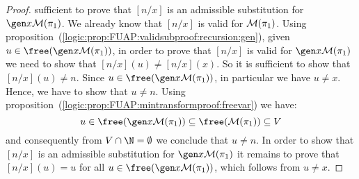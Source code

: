 \begin{proof}
sufficient to prove that $[n/x]$ is an admissible substitution for
$\gen x{\cal M}(\pi_{1})$. We already know that $[n/x]$ is valid for
${\cal M}(\pi_{1})$. Using
proposition~(\ref{logic:prop:FUAP:validsubproof:recursion:gen}),
given $u\in\free(\gen x{\cal M}(\pi_{1}))$, in order to prove that
$[n/x]$ is valid for $\gen x{\cal M}(\pi_{1})$ we need to show that
$[n/x](u)\neq[n/x](x)$. So it is sufficient to show that
$[n/x](u)\neq n$. Since $u\in\free(\gen x{\cal M}(\pi_{1}))$, in
particular we have $u\neq x$. Hence, we have to show that $u\neq n$.
Using proposition~(\ref{logic:prop:FUAP:mintransformproof:freevar})
we have:
    \[
    u\in\free(\gen x{\cal M}(\pi_{1}))\subseteq\free({\cal M}(\pi_{1}))\subseteq V
    \]
and consequently from $V\cap\N=\emptyset$ we conclude that $u\neq
n$. In order to show that  $[n/x]$ is an admissible substitution for
$\gen x{\cal M}(\pi_{1})$ it remains to prove that $[n/x](u)=u$ for
all $u\in\free(\gen x{\cal M}(\pi_{1}))$, which follows from $u\neq
x$.
\end{proof}
